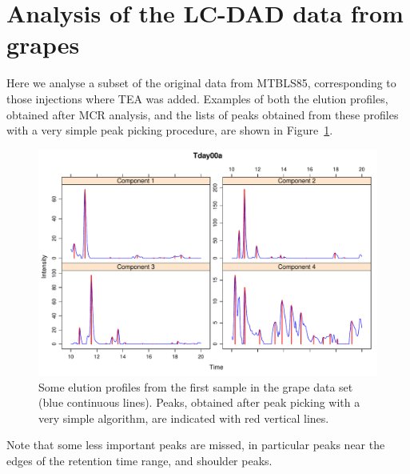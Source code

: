 \documentclass[a4paper,11pt]{article}
\begin{document}
\section{Analysis of the LC-DAD data from grapes}
Here we analyse a subset of the original data from MTBLS85,
corresponding to those injections where TEA was added. Examples of
both the elution profiles, obtained after MCR analysis, and the lists
of peaks obtained from these profiles with a very simple peak picking
procedure, are shown in Figure~\ref{fig:dadProfiles}. 
\begin{figure}[tb]
  \centering
\includegraphics{stickPTW-003}
\caption{Some elution profiles from the first sample in the grape data set
  (blue continuous lines). Peaks, obtained after peak picking with a
  very simple algorithm, are indicated with red vertical lines.}
\label{fig:dadProfiles}
\end{figure}
Note that some less important peaks are missed, in particular peaks
near the edges of the retention time range, and shoulder peaks. 
\end{document}
